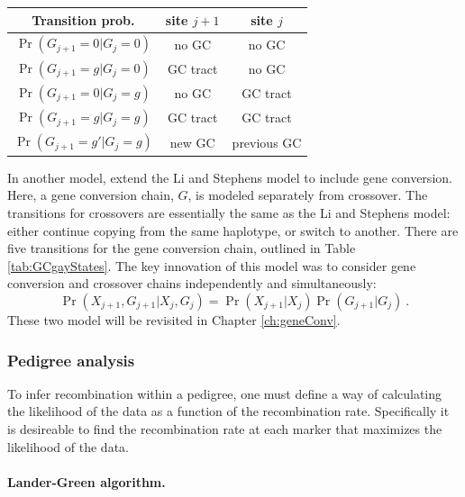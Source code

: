 \begin{table} \vspace{-10pt}
\begin{tabular}{|c|c|c|} 
    \hline Transition prob. & site $j+1$ & site $j$ \\ \hline
    $\Pr(G_{j+1}=0|G_{j}=0)$  & no GC & no GC \\
    $\Pr(G_{j+1}=g|G_{j}=0)$  & GC tract   & no GC  \\
    $\Pr(G_{j+1}=0|G_{j}=g)$  & no GC & GC tract \\
    $\Pr(G_{j+1}=g|G_{j}=g)$  & GC tract   & GC  tract\\
    $\Pr(G_{j+1}=g'|G_{j}=g)$ &  new GC & previous GC  \\
\hline \end{tabular} \vspace{-5pt}
\vspace{-10pt}
\end{table}
%
In another model, \citet{Gay2007} extend the Li and Stephens model to include gene conversion.
Here, a gene conversion chain, $G$, is modeled separately from crossover.
The transitions for crossovers are essentially the same as the Li and Stephens model: either continue copying from the same haplotype, or switch to another.
There are five transitions for the gene conversion chain, outlined in Table \ref{tab:GCgayStates}.
The key innovation of this model was to consider gene conversion and crossover chains independently and simultaneously:
\begin{equation} \Pr(X_{j+1}, G_{j+1} | X_{j},G_{j} ) = \Pr(X_{j+1}|X_{j}) \Pr(G_{j+1}|G_{j}) ~. \end{equation}
%
These two model will be revisited in Chapter \ref{ch:geneConv}.


\subsubsection{Pedigree analysis}

To infer recombination within a pedigree, one must define a way of calculating the likelihood of the data as a function of the recombination rate.
Specifically it is desireable to find the recombination rate at each marker that maximizes the likelihood of the data.


\paragraph{Lander-Green algorithm.}

